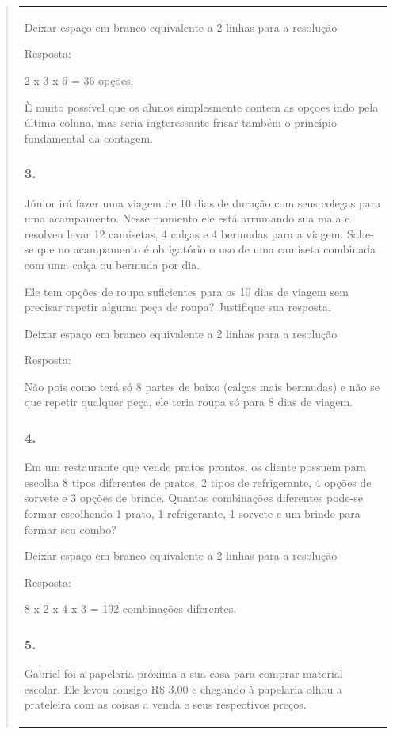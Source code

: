 \begin{enumerate}
\begin{escolha}
\begin{enumerate}
\begin{itemize}
\begin{itemize}
\begin{escolha}
\begin{quote}
\begin{escolha}
{\begin{longtable}[]{@{}l@{}}
\begin{itemize}
Deixar espaço em branco equivalente a 2 linhas para a resolução

Resposta:

2 x 3 x 6 = 36 opções.

È muito possível que os alunos simplesmente contem as opçoes indo pela
última coluna, mas seria ingteressante frisar também o princípio
fundamental da contagem.

\subsubsection{3.}\label{section-132}

Júnior irá fazer uma viagem de 10 dias de duração com seus colegas para
uma acampamento. Nesse momento ele está arrumando sua mala e resolveu
levar 12 camisetas, 4 calças e 4 bermudas para a viagem. Sabe-se que no
acampamento é obrigatório o uso de uma camiseta combinada com uma calça
ou bermuda por dia.

Ele tem opções de roupa suficientes para os 10 dias de viagem sem
precisar repetir alguma peça de roupa? Justifique sua resposta.

Deixar espaço em branco equivalente a 2 linhas para a resolução

Resposta:

Não pois como terá só 8 partes de baixo (calças mais bermudas) e não se
que repetir qualquer peça, ele teria roupa só para 8 dias de viagem.

\subsubsection{4.}\label{section-133}

Em um restaurante que vende pratos prontos, os cliente possuem para
escolha 8 tipos diferentes de pratos, 2 tipos de refrigerante, 4 opções
de sorvete e 3 opções de brinde. Quantas combinações diferentes pode-se
formar escolhendo 1 prato, 1 refrigerante, 1 sorvete e um brinde para
formar seu combo?

Deixar espaço em branco equivalente a 2 linhas para a resolução

Resposta:

8 x 2 x 4 x 3 = 192 combinações diferentes.

\subsubsection{5.}\label{section-134}

Gabriel foi a papelaria próxima a sua casa para comprar material
escolar. Ele levou consigo R\$ 3,00 e chegando à papelaria olhou a
prateleira com as coisas a venda e seus respectivos preços.


\end{itemize}
\end{longtable}}
\end{escolha}
\end{quote}
\end{escolha}
\end{itemize}
\end{itemize}
\end{enumerate}
\end{escolha}
\end{enumerate}
